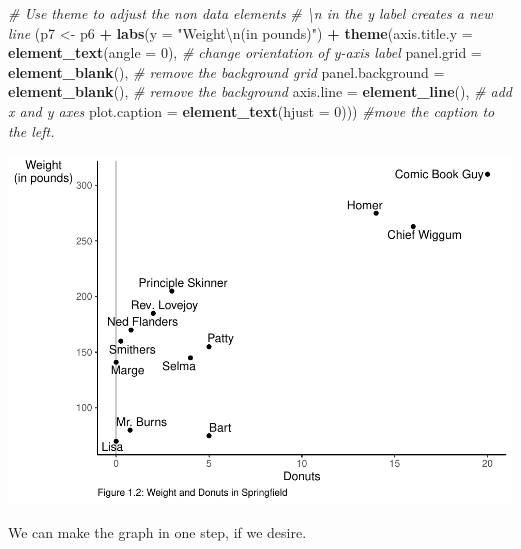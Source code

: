 \documentclass[]{book}
\newenvironment{Shaded}{\begin{snugshade}}{\end{snugshade}}
\newcommand{\CharTok}[1]{\textcolor[rgb]{0.31,0.60,0.02}{#1}}
\newcommand{\CommentTok}[1]{\textcolor[rgb]{0.56,0.35,0.01}{\textit{#1}}}
\newcommand{\DataTypeTok}[1]{\textcolor[rgb]{0.13,0.29,0.53}{#1}}
\newcommand{\DecValTok}[1]{\textcolor[rgb]{0.00,0.00,0.81}{#1}}
\newcommand{\KeywordTok}[1]{\textcolor[rgb]{0.13,0.29,0.53}{\textbf{#1}}}
\newcommand{\NormalTok}[1]{#1}
\newcommand{\OperatorTok}[1]{\textcolor[rgb]{0.81,0.36,0.00}{\textbf{#1}}}
\newcommand{\StringTok}[1]{\textcolor[rgb]{0.31,0.60,0.02}{#1}}
\begin{document}
\begin{Shaded}
\begin{Highlighting}[]
\CommentTok{# Use theme to adjust the non data elements}
\CommentTok{# \textbackslash{}n in the y label creates a new line}
\NormalTok{(p7 <-}\StringTok{ }\NormalTok{p6 }\OperatorTok{+}\StringTok{ }\KeywordTok{labs}\NormalTok{(}\DataTypeTok{y =} \StringTok{"Weight}\CharTok{\textbackslash{}n}\StringTok{(in pounds)"}\NormalTok{) }\OperatorTok{+}\StringTok{ }
\StringTok{    }\KeywordTok{theme}\NormalTok{(}\DataTypeTok{axis.title.y =} \KeywordTok{element_text}\NormalTok{(}\DataTypeTok{angle =} \DecValTok{0}\NormalTok{), }\CommentTok{# change orientation of y-axis label}
          \DataTypeTok{panel.grid =} \KeywordTok{element_blank}\NormalTok{(), }\CommentTok{# remove the background grid}
          \DataTypeTok{panel.background =} \KeywordTok{element_blank}\NormalTok{(), }\CommentTok{# remove the background}
          \DataTypeTok{axis.line =} \KeywordTok{element_line}\NormalTok{(), }\CommentTok{# add x and y axes}
          \DataTypeTok{plot.caption =} \KeywordTok{element_text}\NormalTok{(}\DataTypeTok{hjust =} \DecValTok{0}\NormalTok{))) }\CommentTok{#move the caption to the left.}
\end{Highlighting}
\end{Shaded}

\includegraphics{bailey_files/figure-latex/unnamed-chunk-3-6.pdf}

We can make the graph in one step, if we desire.
\end{document}
